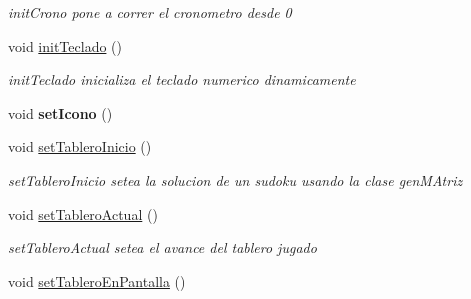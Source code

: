 \begin{DoxyCompactItemize}
\begin{DoxyCompactList}\small\item\em init\-Crono pone a correr el cronometro desde 0 \end{DoxyCompactList}\item 
\hypertarget{class_main_table_a5127d725082ee137e1bc1bfe25d707e8}{void \hyperlink{class_main_table_a5127d725082ee137e1bc1bfe25d707e8}{init\-Teclado} ()}\label{class_main_table_a5127d725082ee137e1bc1bfe25d707e8}

\begin{DoxyCompactList}\small\item\em init\-Teclado inicializa el teclado numerico dinamicamente \end{DoxyCompactList}\item 
\hypertarget{class_main_table_ad147fcd673d5ee78b74f1c0eed831d72}{void {\bfseries set\-Icono} ()}\label{class_main_table_ad147fcd673d5ee78b74f1c0eed831d72}

\item 
\hypertarget{class_main_table_aac8a8a955c76db4ed9f89ce92a38e994}{void \hyperlink{class_main_table_aac8a8a955c76db4ed9f89ce92a38e994}{set\-Tablero\-Inicio} ()}\label{class_main_table_aac8a8a955c76db4ed9f89ce92a38e994}

\begin{DoxyCompactList}\small\item\em set\-Tablero\-Inicio setea la solucion de un sudoku usando la clase gen\-M\-Atriz \end{DoxyCompactList}\item 
\hypertarget{class_main_table_a98cde4888cd2d755dadb0d3ae991df8f}{void \hyperlink{class_main_table_a98cde4888cd2d755dadb0d3ae991df8f}{set\-Tablero\-Actual} ()}\label{class_main_table_a98cde4888cd2d755dadb0d3ae991df8f}

\begin{DoxyCompactList}\small\item\em set\-Tablero\-Actual setea el avance del tablero jugado \end{DoxyCompactList}\item 
\hypertarget{class_main_table_a79d14309262e6b67ce1e57a9d491919b}{void \hyperlink{class_main_table_a79d14309262e6b67ce1e57a9d491919b}{set\-Tablero\-En\-Pantalla} ()}\label{class_main_table_a79d14309262e6b67ce1e57a9d491919b}


\end{DoxyCompactItemize}
